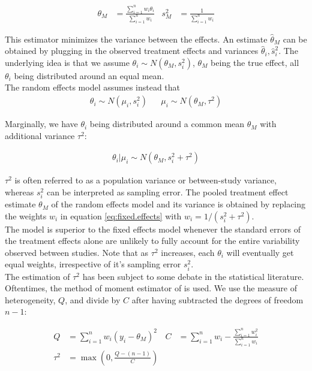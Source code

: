 \documentclass[11pt,a4paper,twoside]{book}\usepackage[]{graphicx}\usepackage[]{color}
\begin{document}
\begin{align}
\theta_M &= \frac{\sum_{i = 1}^n w_i \theta_i}{\sum_{i = 1}^n w_i} &
s_M^2 &= \frac{1}{\sum_{i = 1}^n w_i} \label{eq:fixed.effects}
\end{align}

This estimator minimizes the variance between the effects. An estimate $\hat{\theta}_M$ can be obtained by plugging in the observed treatment effects and variances $\hat{\theta}_i, \hat{s}_i^2$. The underlying idea is that we assume $\theta_i \sim N(\theta_M, s_i^2)$, $\theta_M$ being the true effect, all $\theta_i$ being distributed around an equal mean. \\
The random effects model \citep{whitehead} assumes instead that 
\begin{align}
\theta_i \sim N(\mu_i, s_i^2) &&
\mu_i \sim N(\theta_M, \tau^2) \label{eq:random.effects} 
\end{align}

Marginally, we have $\theta_i$ being distributed around a common mean $\theta_M$ with additional variance $\tau^2$:

\begin{align}
\theta_i | \mu_i \sim N(\theta_M, s_i^2 + \tau^2) \nonumber %
\end{align}

$\tau^2$ is often referred to as a population variance or between-study variance, whereas $s_i^2$ can be interpreted as sampling error. The pooled treatment effect estimate $\theta_M$ of the random effects model and its variance is obtained by replacing the weights $w_i$ in equation \ref{eq:fixed.effects} with $w_i = 1/(s_i^2 + \tau^2)$. \\
The model is superior to the fixed effects model whenever the standard errors of the treatment effects alone are unlikely to fully account for the entire variability observed between studies. Note that as $\tau^2$ increases, each $\theta_i$ will eventually get equal weights, irrespective of it's sampling error $s_i^2$.\\
The estimation of $\tau^2$ has been subject to some debate in the statistical literature. Oftentimes, the method of moment estimator of \citet{tau.estimator} is used.
We use the measure of heterogeneity, $Q$, and divide by $C$ after having subtracted the degrees of freedom $n-1$:

\begin{align}
Q &= \sum_{i = 1}^n w_i(y_i - \theta_M)^2 & C &= \sum_{i = 1}^n w_i - \frac{\sum_{i = 1}^n w_i^2}{\sum_{i = 1}^n w_i}\label{eq:Q.heterogeneity} \\
\tau^2 &= \max(0, \frac{Q - (n-1)}{C}) \label{eq:Tau.definition}
\end{align}
\end{document}

